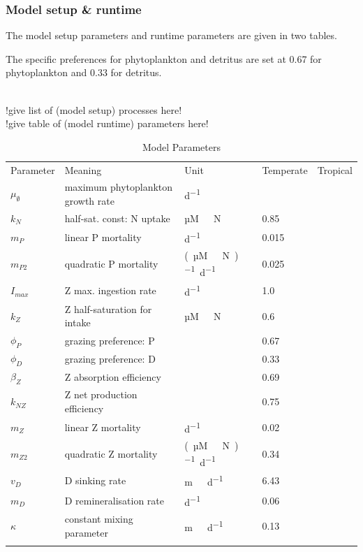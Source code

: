 \documentclass[template.tex]{subfiles}
\begin{document}
\clearpage

\subsubsection{Model setup \& runtime}
The model setup parameters and runtime parameters are given in two tables.

The specific preferences for phytoplankton and detritus are set at 0.67 for phytoplankton and 0.33 for detritus.

\\

!give list of (model setup) processes here!\\


!give table of (model runtime) parameters here!\\


\begin{table}[t]
\caption{Model Parameters}
\begin{tabular}{l l l l l}
Parameter & Meaning & Unit & Temperate & Tropical \\
\tophline

$\mu_{\emptyset}$ & maximum phytoplankton growth rate  & \unit{d^{-1}} & & \\
$k_N$ & half-sat. const: N uptake & \unit{µM \ N} & 0.85 & \\
$m_P$ & linear P mortality & \unit{d^{−1}} & 0.015 & \\
$m_{P2}$ & quadratic P mortality & \unit{(µM \ N)^{-1} d^{−1}} & 0.025 & \\
$I_{max}$ & Z max. ingestion rate & \unit{d^{−1}} & 1.0 & \\
$k_Z$ & Z half-saturation for intake & \unit{µM \ N} & 0.6 & \\
$\phi_P$ & grazing preference: P & & 0.67 & \\
$\phi_D$ & grazing preference: D & & 0.33 & \\
$\beta_Z$ & Z absorption efficiency & & 0.69 & \\
$k_{NZ}$ & Z net production efficiency & & 0.75 &  \\
$m_Z$ & linear Z mortality  & \unit{d^{−1}} & 0.02 & \\
$m_{Z2}$ & quadratic Z mortality & \unit{(µM \ N)^{-1} d^{−1}} & 0.34 & \\
$v_D$ & D sinking rate & \unit{m \ d^{−1}} & 6.43 & \\
$m_D$ & D remineralisation rate & \unit{d^{−1}} & 0.06 & \\
$\kappa$ & constant mixing parameter & \unit{m \ d^{−1}} & 0.13 & \\
\middlehline

\bottomhline
\end{tabular}
\label{Table:UseCase1Parameters}
\end{table}
%
\end{document}
